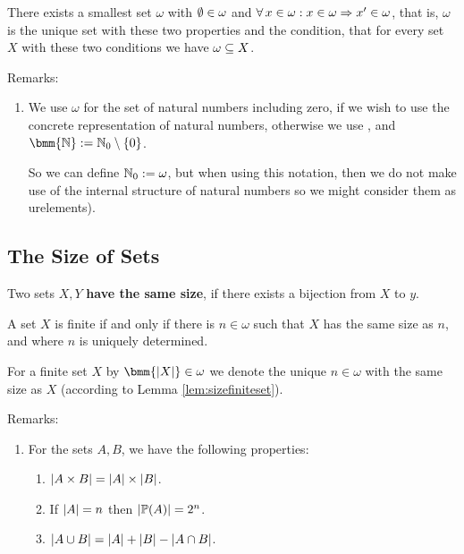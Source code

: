 \documentclass[12pt]{book}
\begin{document}
\begin{lem}\label{lem:omega}
      There exists a smallest set $\omega$ with $\emptyset \in \omega$ and $\forall\, x \in \omega : x \in \omega \Rightarrow x' \in \omega$, that is, $\omega$ is 
	  the unique set with these two properties and the condition, that for every set $X$ with these two conditions we have $\omega \subseteq X$.
\end{lem}
Remarks:
\begin{enumerate}
      \item We use $\omega$ for the set of natural numbers including zero, if we wish to use the concrete representation of natural numbers, otherwise 
	  we use \bmm{\NNZ}, and $\bmm{\NN} := \NNZ \sm \set{0}$.

      So we can define $\mathbb{N}_0 := \omega$, but when using this notation, then we do not make use of the internal structure of natural numbers 
	  so we might consider them as urelements).
\end{enumerate}
\subsection{The Size of Sets}
\label{sec:sizeofsets}

\begin{defi}\label{def:equalsize}
      Two sets $X, Y$ \textbf{have the same size}, if there exists a bijection from $X$ to $y$.
\end{defi}
\begin{lem}\label{lem:sizefiniteset}
      A set $X$ is finite if and only if there is $n \in \omega$ such that $X$ has the same size as $n$, and where $n$ is uniquely determined.
\end{lem}
\begin{defi}\label{def:sizefiniteset}
      For a finite set $X$ by $\bmm{\abs{X}} \in \omega$ we denote the unique $n \in \omega$ with the same size as $X$ (according to Lemma 
	  \ref{lem:sizefiniteset}).
\end{defi}
Remarks:
\begin{enumerate}
      \item For the sets $A , B$, we have the following properties:
      \begin{enumerate}
            \item $\lvert A \times B  \rvert= \lvert A \rvert \times \lvert B \rvert$.
	        \item If $\lvert A \rvert = n$ then $\lvert \operatorname{\mathbb{P}}(A) \rvert = 2^n$.
	        \item $\lvert A \cup B \rvert = \lvert A \rvert + \lvert B \rvert - \lvert A \cap B \rvert$.
      \end{enumerate} 
\end{enumerate}
\end{document}
